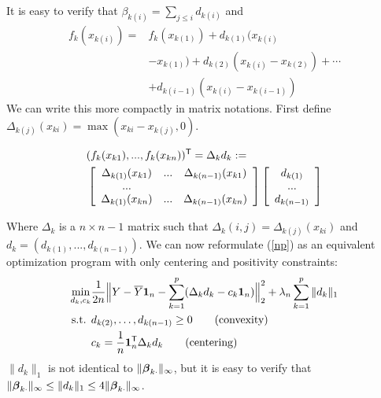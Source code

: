 It is easy to verify that $\beta_{k(i)} = \sum_{j \leq i} d_{k(i)}$ and 
\begin{equation}
\begin{split}
f_k(x_{k(i)}) = & f_k({x_{k(1)}}) +d_{k(1)} ( x_{k(i)} \\
& - x_{k(1)}) + d_{k(2)} ( x_{k(i)} - x_{k(2)}) + \cdots  \\
& + d_{k(i-1)} ( x_{k(i)} - x_{k(i-1)})
\end{split}
\end{equation}
We can write this more compactly in matrix notations. First define $\Delta_{k(j)}(x_{ki}) = \max( x_{ki} - x_{k(j)}, 0)$. 


\begin{equation*}
\begin{split}
&(f_k(x_{k1}) ,..., f_k(x_{kn}))^\tran = \Delta_k d_k \coloneqq \\
\vspace{0.1in}
&\left[ \begin{array}{ccc}
    \Delta_{k(1)}(x_{k1}) & ... & \Delta_{k(n-1)}(x_{k1}) \\
    ... & & \\
    \Delta_{k(1)}(x_{kn}) & ... & \Delta_{k(n-1)}(x_{kn}) 
\end{array} \right]
\left[ \begin{array}{c}
    d_{k(1)} \\
    ... \\
    d_{k(n-1)}
\end{array} \right] 
\end{split}
\end{equation*}

Where $\Delta_k$ is a $n\times n-1$ matrix such that $\Delta_k(i,j) = \Delta_{k(j)}(x_{ki})$ and $d_k = (d_{k(1)} ,..., d_{k(n-1)})$. We can now reformulate (\ref{np}) as an equivalent optimization program with only centering and positivity constraints:
\begin{align}
\min_{d_k, c_k}& \frac{1}{2n} 
       \Bigl\| Y - \overline{Y}\mbox{\boldmath $1$}_n - \sum_{k=1}^p 
             ( \Delta_k d_k - c_k \mbox{\boldmath $1$}_n) \Bigr\|_2^2 
               + \lambda_n \sum_{k=1}^p \|d_k\|_1   \label{opt:alternate_opt} \\
\textrm{s.t. }  & d_{k(2)}, \ldots , d_{k(n-1)} \geq 0  	
               \qquad \textrm{(convexity)} \nonumber \\ 
	& c_k = \frac{1}{n} \mbox{\boldmath $1$}_n^{\mathsf{T}} \Delta_k d_k 	
               \qquad \textrm{(centering)} \nonumber 
\end{align}
$\|d_k\|_1$ is not identical to $\|\boldsymbol{\beta}_{k\cdot}\|_{\infty}$, but it is easy to verify that $\|\boldsymbol{\beta}_{k\cdot}\|_{\infty} \leq \|d_k\|_1 \leq 4\|\boldsymbol{\beta}_{k\cdot}\|_{\infty}$.

